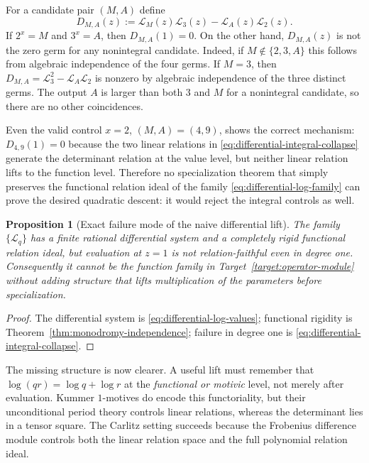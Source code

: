 \documentclass[11pt,oneside]{article}
\newtheorem{proposition}[theorem]{Proposition}
\theoremstyle{definition}
\theoremstyle{remark}
\newcommand{\cL}{\mathcal L}
\begin{document}
For a candidate pair $(M,A)$ define
\begin{equation}
  D_{M,A}(z):=\cL_M(z)\cL_3(z)-\cL_A(z)\cL_2(z).
  \label{eq:differential-determinant}
\end{equation}
If $2^x=M$ and $3^x=A$, then $D_{M,A}(1)=0$.  On the other hand,
$D_{M,A}(z)$ is not the zero germ for any nonintegral candidate.  Indeed, if
$M\notin\{2,3,A\}$ this follows from algebraic independence of the four germs.  If $M=3$,
then $D_{M,A}=\cL_3^2-\cL_A\cL_2$ is nonzero by algebraic independence of the three distinct
germs.  The output $A$ is larger than both $3$ and $M$ for a nonintegral candidate, so there
are no other coincidences.

Even the valid control $x=2$, $(M,A)=(4,9)$, shows the correct mechanism:
$D_{4,9}(1)=0$ because the two linear relations in
\eqref{eq:differential-integral-collapse} generate the determinant relation at the value level,
but neither linear relation lifts to the function level.  Therefore no specialization theorem
that simply preserves the functional relation ideal of the family
\eqref{eq:differential-log-family} can prove the desired quadratic descent: it would reject the
integral controls as well.

\begin{proposition}[Exact failure mode of the naive differential lift]
\label{prop:differential-failure}
The family $\{\cL_q\}$ has a finite rational differential system and a completely rigid
functional relation ideal, but evaluation at $z=1$ is not relation-faithful even in degree one.
Consequently it cannot be the function family in Target~\ref{target:operator-module} without
adding structure that lifts multiplication of the parameters before specialization.
\end{proposition}

\begin{proof}
The differential system is \eqref{eq:differential-log-values}; functional rigidity is
Theorem~\ref{thm:monodromy-independence}; failure in degree one is
\eqref{eq:differential-integral-collapse}.
\end{proof}

The missing structure is now clearer.  A useful lift must remember that
$\log(qr)=\log q+\log r$ at the \emph{functional or motivic} level, not merely after evaluation.
Kummer $1$-motives do encode this functoriality, but their unconditional period theory controls
linear relations, whereas the determinant lies in a tensor square.  The Carlitz setting succeeds
because the Frobenius difference module controls both the linear relation space and the full
polynomial relation ideal.
\end{document}

